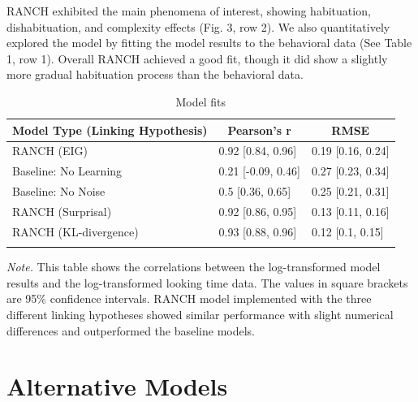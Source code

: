 \documentclass[
  man,floatsintext]{apa6}
\begin{document}
RANCH exhibited the main phenomena of interest, showing habituation, dishabituation, and complexity effects (Fig. 3, row 2). We also quantitatively explored the model by fitting the model results to the behavioral data (See Table 1, row 1). Overall RANCH achieved a good fit, though it did show a slightly more gradual habituation process than the behavioral data.

\begin{table}[tbp]

\begin{center}
\begin{threeparttable}

\caption{\label{tab:unnamed-chunk-13}Model fits}

\begin{tabular}{lll}
\toprule
Model Type (Linking Hypothesis) & \multicolumn{1}{c}{Pearson's r} & \multicolumn{1}{c}{RMSE}\\
\midrule
RANCH (EIG) & 0.92 [0.84, 0.96] & 0.19 [0.16, 0.24]\\
Baseline: No Learning & 0.21 [-0.09, 0.46] & 0.27 [0.23, 0.34]\\
Baseline: No Noise & 0.5 [0.36, 0.65] & 0.25 [0.21, 0.31]\\
RANCH (Surprisal) & 0.92 [0.86, 0.95] & 0.13 [0.11, 0.16]\\
RANCH (KL-divergence) & 0.93 [0.88, 0.96] & 0.12 [0.1, 0.15]\\
\bottomrule
\addlinespace
\end{tabular}

\begin{tablenotes}[para]
\normalsize{\textit{Note.} This table shows the correlations between the log-transformed model results and the log-transformed looking time data. The values in square brackets are 95\% confidence intervals. RANCH model implemented with the three different linking hypotheses showed similar performance with slight numerical differences and outperformed the baseline models.}
\end{tablenotes}

\end{threeparttable}
\end{center}

\end{table}

\hypertarget{alternative-models}{%
\section{Alternative Models}\label{alternative-models}}
\end{document}
